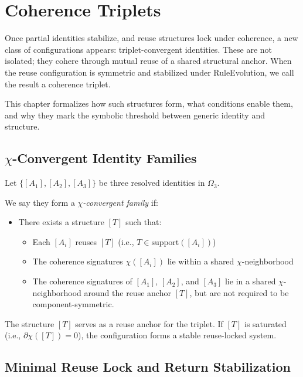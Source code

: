 \chapter{Coherence Triplets}

Once partial identities stabilize, and reuse structures lock under
coherence, a new class of configurations appears: triplet-convergent
identities. These are not isolated; they cohere through mutual reuse of
a shared structural anchor. When the reuse configuration is symmetric
and stabilized under RuleEvolution, we call the result a coherence
triplet.

This chapter formalizes how such structures form, what conditions enable
them, and why they mark the symbolic threshold between generic identity
and structure.

\section{$\chi$-Convergent Identity Families} \label{chi-convergent-identity-families}

Let $\{ [A_1], [A_2], [A_3] \}$ be three resolved identities in $\Omega_3$.

We say they form a \textit{$\chi$-convergent family} if:

\begin{itemize}
  \item There exists a structure $[T]$ such that:
  \begin{itemize}
    \item Each $[A_i]$ reuses $[T]$ (i.e., $T \in \text{support}([A_i])$)
    \item The coherence signatures $\chi([A_i])$ lie within a shared $\chi$-neighborhood
	\item The coherence signatures of $[A_1]$, $[A_2]$, and $[A_3]$ lie in a shared $\chi$-neighborhood around the reuse anchor $[T]$, but are not required to be component-symmetric.
  \end{itemize}
\end{itemize}

The structure $[T]$ serves as a reuse anchor for the triplet.  
If $[T]$ is saturated (i.e., $\partial \chi([T]) = 0$),  
the configuration forms a stable reuse-locked system.

\section{Minimal Reuse Lock and Return Stabilization} \label{minimal-reuse-lock-and-return-stabilization}

